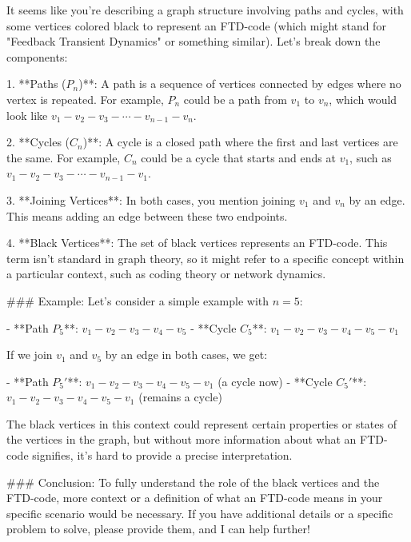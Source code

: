 It seems like you're describing a graph structure involving paths and cycles, with some vertices colored black to represent an FTD-code (which might stand for "Feedback Transient Dynamics" or something similar). Let's break down the components:

1. **Paths ($P_n$)**: A path is a sequence of vertices connected by edges where no vertex is repeated. For example, \(P_n\) could be a path from \(v_1\) to \(v_n\), which would look like \(v_1 - v_2 - v_3 - \cdots - v_{n-1} - v_n\).

2. **Cycles ($C_n$)**: A cycle is a closed path where the first and last vertices are the same. For example, \(C_n\) could be a cycle that starts and ends at \(v_1\), such as \(v_1 - v_2 - v_3 - \cdots - v_{n-1} - v_1\).

3. **Joining Vertices**: In both cases, you mention joining \(v_1\) and \(v_n\) by an edge. This means adding an edge between these two endpoints.

4. **Black Vertices**: The set of black vertices represents an FTD-code. This term isn't standard in graph theory, so it might refer to a specific concept within a particular context, such as coding theory or network dynamics.

### Example:
Let's consider a simple example with \(n = 5\):

- **Path \(P_5\)**: \(v_1 - v_2 - v_3 - v_4 - v_5\)
- **Cycle \(C_5\)**: \(v_1 - v_2 - v_3 - v_4 - v_5 - v_1\)

If we join \(v_1\) and \(v_5\) by an edge in both cases, we get:

- **Path \(P_5'\)**: \(v_1 - v_2 - v_3 - v_4 - v_5 - v_1\) (a cycle now)
- **Cycle \(C_5'\)**: \(v_1 - v_2 - v_3 - v_4 - v_5 - v_1\) (remains a cycle)

The black vertices in this context could represent certain properties or states of the vertices in the graph, but without more information about what an FTD-code signifies, it's hard to provide a precise interpretation.

### Conclusion:
To fully understand the role of the black vertices and the FTD-code, more context or a definition of what an FTD-code means in your specific scenario would be necessary. If you have additional details or a specific problem to solve, please provide them, and I can help further!